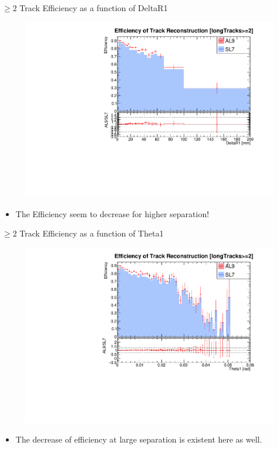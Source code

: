 \begin{frame}{$\geq2$ Track Efficiency as a function of DeltaR1}
    \begin{figure}
        \includegraphics[width=0.8\linewidth]{./output/Effi_greq2_DeltaR1_unzoom.pdf}
    \end{figure}
    \begin{itemize}
        \item The Efficiency seem to decrease for higher separation!
    \end{itemize}
\end{frame}

\begin{frame}{$\geq2$ Track Efficiency as a function of Theta1}
    \begin{figure}
        \includegraphics[width=0.8\linewidth]{./output/Effi_greq2_Theta1.pdf}
    \end{figure}
    \begin{itemize}
        \item The decrease of efficiency at large separation is existent here as well.
    \end{itemize}
\end{frame}

